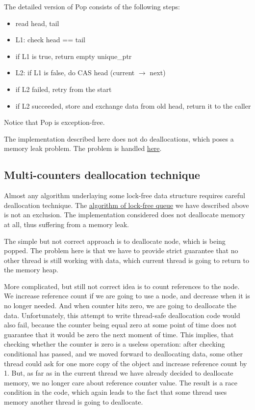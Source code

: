 \documentclass{article}
\begin{document}
The detailed version of Pop consists of the following steps:
\begin{itemize}
	\item read head, tail
	\item L1: check head == tail
	\item if L1 is true, return empty unique\_ptr
	\item L2: if L1 is false, do CAS head (current $\rightarrow$ next)
	\item if L2 failed, retry from the start
	\item if L2 succeeded, store and exchange data from old head, return it to the caller
\end{itemize}

Notice that Pop is exception-free.

The implementation described here does not do deallocations, which poses a memory leak problem. The problem is handled \hyperref[subsec:dealloc_lock_free_queue]{here}.

\subsection{Multi-counters deallocation technique}
\label{subsec:three_counters}

Almost any algorithm underlaying some lock-free data structure requires careful deallocation technique. The \hyperref[subsec:lock_free_queue]{algorithm of lock-free queue} we have described above is not an exclusion. The implementation considered does not deallocate memory at all, thus suffering from a memory leak.

The simple but not correct approach is to deallocate node, which is being popped. The problem here is that we have to provide strict guarantee that no other thread is still working with data, which current thread is going to return to the memory heap.

More complicated, but still not correct idea is to count references to the node. We increase reference count if we are going to use a node, and decrease when it is no longer needed. And when counter hits zero, we are going to deallocate the data. Unfortunately, this attempt to write thread-safe deallocation code would also fail, because the counter being equal zero at some point of time does not guarantee that it would be zero the next moment of time. This implies, that checking whether the counter is zero is a useless operation: after checking conditional has passed, and we moved forward to deallocating data, some other thread could ask for one more copy of the object and increase reference count by 1. But, as far as in the current thread we have already decided to deallocate memory, we no longer care about reference counter value. The result is a race condition in the code, which again leads to the fact that some thread uses memory another thread is going to deallocate.
\end{document}
